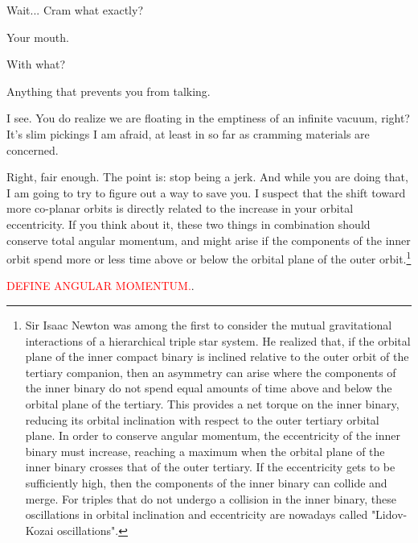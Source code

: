\documentclass[main.tex]{subfiles}
\begin{document}
\par \Alcyone Wait... Cram what exactly?

\par \Celaeno Your mouth.  

\par \Alcyone With what?

\par \Celaeno Anything that prevents you from talking.  

\par \Alcyone I see.  You do realize we are floating in the emptiness of an infinite vacuum, right?  It's slim pickings I am afraid, at least in so far as cramming materials are concerned.

\par \Celaeno Right, fair enough.  The point is:  stop being a jerk.  And while you are doing that, I am going to try to figure out a way to save you.  I suspect that the shift toward more co-planar orbits is directly related to the increase in your orbital eccentricity.  If you think about it, these two things in combination should conserve total angular momentum, and might arise if the components of the inner orbit spend more or less time above or below the orbital plane of the outer orbit.\footnote{Sir Isaac Newton was among the first to consider the mutual gravitational interactions of a hierarchical triple star system.  He realized that, if the orbital plane of the inner compact binary is inclined relative to the outer orbit of the tertiary companion, then an asymmetry can arise where the components of the inner binary do not spend equal amounts of time above and below the orbital plane of the tertiary.  This provides a net torque on the inner binary, reducing its orbital inclination with respect to the outer tertiary orbital plane.  In order to conserve angular momentum, the eccentricity of the inner binary must increase, reaching a maximum when the orbital plane of the inner binary crosses that of the outer tertiary.  If the eccentricity gets to be sufficiently high, then the components of the inner binary can collide and merge.  For triples that do not undergo a collision in the inner binary, these oscillations in orbital inclination and eccentricity are nowadays called "Lidov-Kozai oscillations".} 

\begin{tcolorbox}[sharp corners, colback=red!30, colframe=red!80!blue, title=Angular Momentum]
\par \textcolor{red}{DEFINE ANGULAR MOMENTUM.}. 
\end{tcolorbox}
\end{document}
